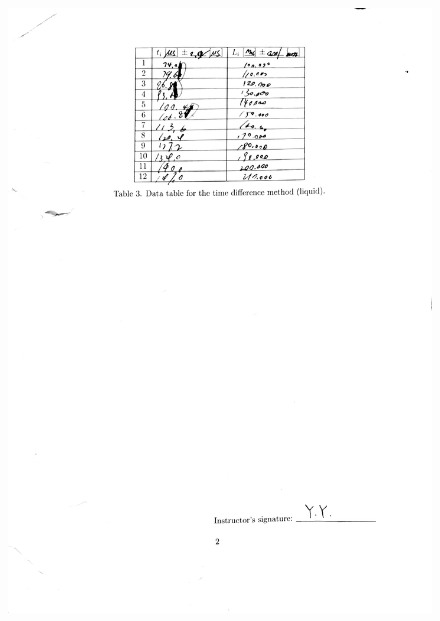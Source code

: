 \documentclass[a4paper]{report}
\begin{document}
	\begin{figure}[H]
		\centering
		\includegraphics[width=1\linewidth]{6.jpg}
	\end{figure}
\end{document}
